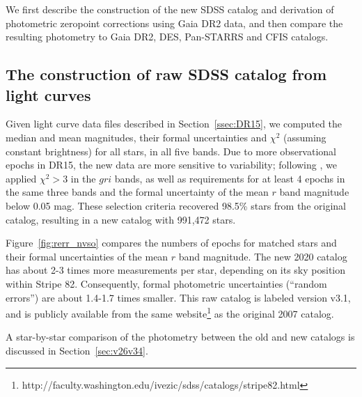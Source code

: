 


We first describe the construction of the new SDSS catalog and derivation of photometric
zeropoint corrections using Gaia DR2 data, and then compare the resulting photometry to 
Gaia DR2, DES, Pan-STARRS and CFIS catalogs. 

 
\subsection{The construction of raw SDSS catalog from light curves \label{sec:averaging}} 

Given light curve data files described in Section~\ref{ssec:DR15}, we computed the median 
and mean magnitudes, their formal uncertainties and $\chi^2$ (assuming constant brightness)
for all stars, in all five bands. Due to more observational epochs in DR15, the new data are more 
sensitive to variability; following \pO, we applied $\chi^2>3$ in the $gri$ bands, as well as  
requirements for at least 4 epochs in the same three bands and the formal uncertainty of the 
mean $r$ band magnitude below 0.05 mag. These selection criteria recovered 98.5\% stars from
the original catalog, resulting in a new catalog with 991,472 stars. 

Figure~\ref{fig:rerr_nvso} compares the numbers of epochs for matched stars and their formal
uncertainties of the mean $r$ band magnitude. The new 2020 catalog has about 2-3 times more 
measurements per star, depending on its sky position within Stripe 82. Consequently,  formal 
photometric uncertainties (``random errors'') are about 1.4-1.7 times smaller. This raw catalog
is labeled version v3.1, and is publicly available from the same
website\footnote{http://faculty.washington.edu/ivezic/sdss/catalogs/stripe82.html} 
as the original 2007 catalog. 

A star-by-star comparison of the photometry between the old and new catalogs is discussed
in Section~\ref{sec:v26v34}. 


